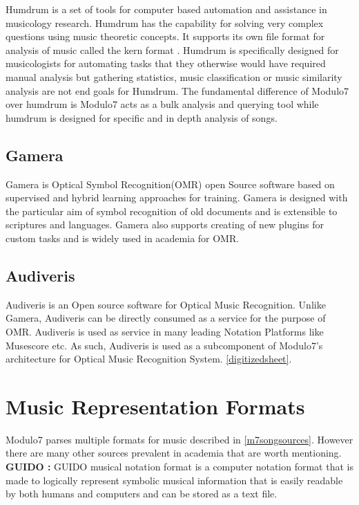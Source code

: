 \noindent Humdrum \cite{humdrum} is a set of tools for computer based automation and assistance in musicology research. Humdrum has the capability for solving very complex questions using music theoretic concepts. It supports its own file format for analysis of music called the kern format \cite{humdrumkern}. Humdrum is specifically designed for musicologists for automating tasks that they otherwise would have required manual analysis but gathering statistics, music classification or music similarity analysis are not end goals for Humdrum. The fundamental difference of Modulo7 over humdrum is Modulo7 acts as a bulk analysis and querying tool while humdrum is designed for specific and in depth analysis of songs.

\subsection{Gamera}

\noindent Gamera \cite{gamera} is Optical Symbol Recognition(OMR) open Source software based on supervised and hybrid learning approaches for training. Gamera is designed with the particular aim of symbol recognition of old documents and is extensible to scriptures and languages. Gamera also supports creating of new plugins for custom tasks and is widely used in academia for OMR. 

\subsection{Audiveris} \label{audiveris}

\noindent Audiveris \cite{audiverishandbook} is an Open source software for Optical Music Recognition. Unlike Gamera, Audiveris can be directly consumed as a service for the purpose of OMR.  Audiveris is used as service in many leading Notation Platforms like Musescore etc. As such, Audiveris is used as a subcomponent of Modulo7's architecture for Optical Music Recognition System. \ref{digitizedsheet}. 

\section{Music Representation Formats}

\noindent Modulo7 parses multiple formats for music described in \ref{m7songsources}. However there are many other sources prevalent in academia that are worth mentioning. \\

\noindent \textbf{GUIDO :} GUIDO musical notation format is a computer notation format that is made to logically represent symbolic musical information that is easily readable by both humans and computers and can be stored as a text file. \\

